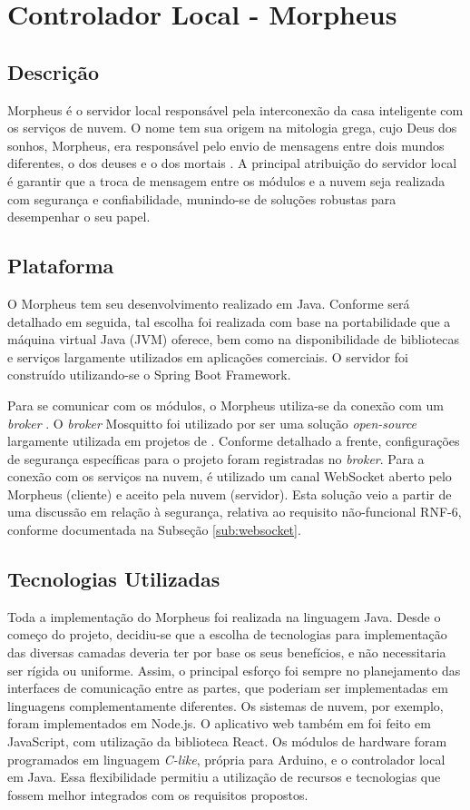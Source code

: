\section{Controlador Local - Morpheus \label{chap:morpheus}}

\subsection{Descrição}
Morpheus é o servidor local responsável pela interconexão da casa inteligente com os serviços de nuvem. O nome tem sua origem na mitologia grega, cujo Deus dos sonhos, Morpheus, era responsável pelo envio de mensagens entre dois mundos diferentes, o dos deuses e o dos mortais \cite{morpheusName}. A principal atribuição do servidor local é garantir que a troca de mensagem entre os módulos e a nuvem seja realizada com segurança e confiabilidade, munindo-se de soluções robustas para desempenhar o seu papel.

\subsection{Plataforma}
O Morpheus tem seu desenvolvimento realizado em Java. Conforme será detalhado em seguida, tal escolha foi realizada com base na portabilidade que a máquina virtual Java (JVM) oferece, bem como na disponibilidade de bibliotecas e serviços largamente utilizados em aplicações comerciais. O servidor foi construído utilizando-se o Spring Boot Framework.

Para se comunicar com os módulos, o Morpheus utiliza-se da conexão com um \emph{broker} \wmqtt{}. O \emph{broker} Mosquitto foi utilizado por ser uma solução \emph{open-source} largamente utilizada em projetos de \wiot. Conforme detalhado a frente, configurações de segurança específicas para o projeto foram registradas no \emph{broker}. Para a conexão com os serviços na nuvem, é utilizado um canal WebSocket aberto pelo Morpheus (cliente) e aceito pela nuvem (servidor). Esta solução veio a partir de uma discussão em relação à segurança, relativa ao requisito não-funcional RNF-6, conforme documentada na Subseção \ref{sub:websocket}.

\subsection{Tecnologias Utilizadas}
Toda a implementação do Morpheus foi realizada na linguagem Java. Desde o começo do projeto, decidiu-se que a escolha de tecnologias para implementação das diversas camadas deveria ter por base os seus benefícios, e não necessitaria ser rígida ou uniforme. Assim, o principal esforço foi sempre no planejamento das interfaces de comunicação entre as partes, que poderiam ser implementadas em linguagens complementamente diferentes. Os sistemas de nuvem, por exemplo, foram implementados em Node.js. O aplicativo web também em foi feito em JavaScript, com utilização da biblioteca React. Os módulos de hardware foram programados em linguagem \emph{C-like}, própria para Arduino, e o controlador local em Java. Essa flexibilidade permitiu a utilização de recursos e tecnologias que fossem melhor integrados com os requisitos propostos.

